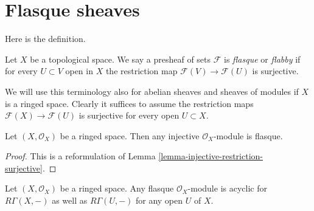 \section{Flasque sheaves}
\label{section-flasque}

\noindent
Here is the definition.

\begin{definition}
\label{definition-flasque}
Let $X$ be a topological space. We say a presheaf of sets
$\mathcal{F}$ is {\it flasque} or {\it flabby} if for every
$U \subset V$ open in $X$ the restriction map
$\mathcal{F}(V) \to \mathcal{F}(U)$ is surjective.
\end{definition}

\noindent
We will use this terminology also for abelian sheaves and
sheaves of modules if $X$ is a ringed space.
Clearly it suffices to assume the restriction maps
$\mathcal{F}(X) \to \mathcal{F}(U)$ is surjective for every
open $U \subset X$.

\begin{lemma}
\label{lemma-injective-flasque}
Let $(X, \mathcal{O}_X)$ be a ringed space.
Then any injective $\mathcal{O}_X$-module is flasque.
\end{lemma}

\begin{proof}
This is a reformulation of Lemma \ref{lemma-injective-restriction-surjective}.
\end{proof}

\begin{lemma}
\label{lemma-flasque-acyclic}
Let $(X, \mathcal{O}_X)$ be a ringed space. Any flasque $\mathcal{O}_X$-module
is acyclic for $R\Gamma(X, -)$ as well as $R\Gamma(U, -)$ for any
open $U$ of $X$.
\end{lemma}

